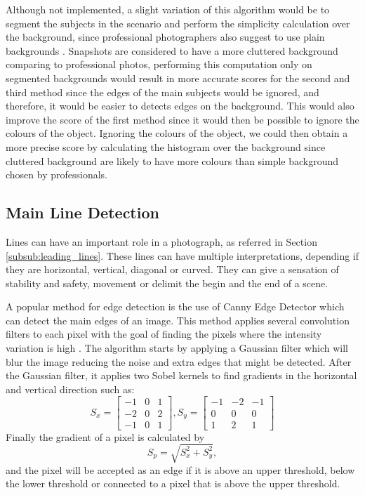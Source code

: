 Although not implemented, a slight variation of this algorithm would be to segment the subjects in the scenario and perform the simplicity calculation over the background, since professional photographers also suggest to use plain backgrounds \cite{Santos}. Snapshots are considered to have a more cluttered background comparing to professional photos, performing this computation only on segmented backgrounds would result in more accurate scores for the second and third method since the edges of the main subjects would be ignored, and therefore, it would be easier to detects edges on the background. This would also improve the score of the first method since it would then be possible to ignore the colours of the object. Ignoring the colours of the object, we could then obtain a more precise score by calculating the histogram over the background since cluttered background are likely to have more colours than simple background chosen by professionals.

\subsection{Main Line Detection}
\label{sub:line_detection}

Lines can have an important role in a photograph, as referred in Section \ref{subsub:leading_lines}. These lines can have multiple interpretations, depending if they are horizontal, vertical, diagonal or curved. They can give a sensation of stability and safety, movement or delimit the begin and the end of a scene.

A popular method for edge detection is the use of Canny Edge Detector \cite{canny1986computational} which can detect the main edges of an image. This method applies several convolution filters to each pixel with the goal of finding the pixels where the intensity variation is high \cite{nobrega2013interactive}.
The algorithm starts by applying a Gaussian filter which will blur the image reducing the noise and extra edges that might be detected. After the Gaussian filter, it applies two Sobel kernels to find gradients in the horizontal and vertical direction such as:
\begin{equation}
S_{x} =
\begin{bmatrix}
	-1 & 0 & 1\\
	-2 & 0 & 2\\
	-1 & 0 & 1
\end{bmatrix}
,
S_{y} = 
\begin{bmatrix}
	-1 & -2 & -1\\
	0 & 0 & 0\\
	1 & 2 & 1
\end{bmatrix}
\end{equation}
Finally the gradient of a pixel is calculated by
\begin{equation}
	S_{p} = \sqrt{S_{x}^{2} + S_{y}^{2}},
\end{equation}
and the pixel will be accepted as an edge if it is above an upper threshold, below the lower threshold or connected to a pixel that is above the upper threshold.

